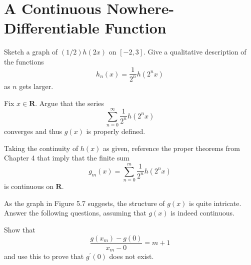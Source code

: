 \section{A Continuous Nowhere-Differentiable Function}

\begin{exercise}
    Sketch a graph of \((1/2)h(2x)\) on \([-2,3]\). Give a qualitative description of the functions
    \[h_n(x) = \frac{1}{2^n}h(2^n x)\] as \(n\) gets larger.
\end{exercise}

\begin{exercise}
 Fix $x \in \mathbf{R}$. Argue that the series
\[
\sum_{n=0}^{\infty} \frac{1}{2^{n}} h\left(2^{n} x\right)
\]
converges and thus $g(x)$ is properly defined.

\end{exercise}

\begin{exercise}
Taking the continuity of $h(x)$ as given, reference the proper theorems from Chapter 4 that imply that the finite sum
\[
g_{m}(x)=\sum_{n=0}^{m} \frac{1}{2^{n}} h\left(2^{n} x\right)
\]
is continuous on $\mathbf{R}$.
\end{exercise}

\begin{exercise}
As the graph in Figure 5.7 suggests, the structure of $g(x)$ is quite intricate. Answer the following questions, assuming that $g(x)$ is indeed continuous.
\end{exercise}

\begin{exercise}
Show that
$$
\frac{g\left(x_{m}\right)-g(0)}{x_{m}-0}=m+1
$$
and use this to prove that $g^{\prime}(0)$ does not exist.
\end{exercise}

\begin{exercise}

\end{exercise}

